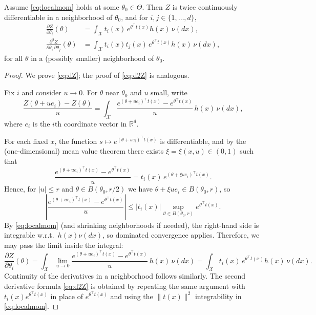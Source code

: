 \begin{lem}
\label{lem:diff-under-int}
Assume \eqref{eq:localmom} holds at some $\theta_0\in\Theta$. Then $Z$ is twice continuously differentiable
in a neighborhood of $\theta_0$, and for $i,j\in\{1,\dots,d\}$,
\begin{align}
\frac{\partial Z}{\partial \theta_i}(\theta)
&=
\int_{\mathcal X} t_i(x)\, e^{\theta^\top t(x)} h(x)\,\nu(dx),
\label{eq:dZ}
\\
\frac{\partial^2 Z}{\partial \theta_i\,\partial \theta_j}(\theta)
&=
\int_{\mathcal X} t_i(x)t_j(x)\, e^{\theta^\top t(x)} h(x)\,\nu(dx),
\label{eq:d2Z}
\end{align}
for all $\theta$ in a (possibly smaller) neighborhood of $\theta_0$.
\end{lem}

\begin{proof}
We prove \eqref{eq:dZ}; the proof of \eqref{eq:d2Z} is analogous.

Fix $i$ and consider $u\to 0$. For $\theta$ near $\theta_0$ and $u$ small, write
\[
\frac{Z(\theta+u e_i)-Z(\theta)}{u}
=
\int_{\mathcal X}
\frac{e^{(\theta+u e_i)^\top t(x)} - e^{\theta^\top t(x)}}{u}\, h(x)\,\nu(dx),
\]
where $e_i$ is the $i$th coordinate vector in $\mathbb R^d$.

For each fixed $x$, the function $s\mapsto e^{(\theta+s e_i)^\top t(x)}$ is differentiable, and by the
(one-dimensional) mean value theorem there exists $\xi=\xi(x,u)\in(0,1)$ such that
\[
\frac{e^{(\theta+u e_i)^\top t(x)} - e^{\theta^\top t(x)}}{u}
=
t_i(x)\, e^{(\theta+\xi u e_i)^\top t(x)}.
\]
Hence, for $|u|\le r$ and $\theta\in B(\theta_0,r/2)$ we have $\theta+\xi u e_i\in B(\theta_0,r)$, so
\[
\left|
\frac{e^{(\theta+u e_i)^\top t(x)} - e^{\theta^\top t(x)}}{u}
\right|
\le
|t_i(x)| \sup_{\vartheta\in B(\theta_0,r)} e^{\vartheta^\top t(x)}.
\]
By \eqref{eq:localmom} (and shrinking neighborhoods if needed), the right-hand side is integrable w.r.t.\ $h(x)\nu(dx)$,
so dominated convergence applies. Therefore, we may pass the limit inside the integral:
\[
\frac{\partial Z}{\partial \theta_i}(\theta)
=
\int_{\mathcal X} \lim_{u\to 0}
\frac{e^{(\theta+u e_i)^\top t(x)} - e^{\theta^\top t(x)}}{u}\, h(x)\,\nu(dx)
=
\int_{\mathcal X} t_i(x)\, e^{\theta^\top t(x)} h(x)\,\nu(dx).
\]
Continuity of the derivatives in a neighborhood follows similarly. The second derivative formula \eqref{eq:d2Z} is obtained
by repeating the same argument with $t_i(x)e^{\theta^\top t(x)}$ in place of $e^{\theta^\top t(x)}$ and using the
$\|t(x)\|^2$ integrability in \eqref{eq:localmom}.
\end{proof}

